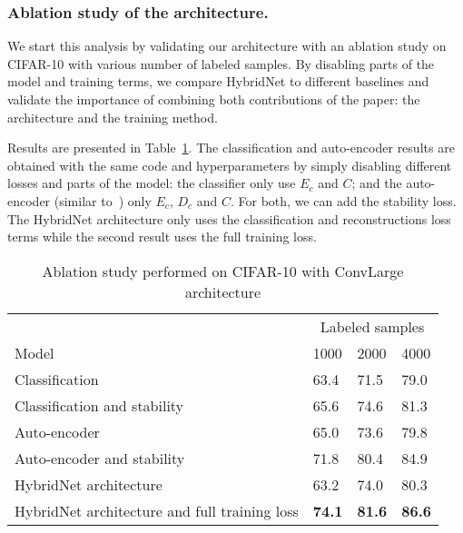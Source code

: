 \documentclass[runningheads]{llncs}
\begin{document}
\subsubsection{Ablation study of the architecture.}

We start this analysis by validating our architecture with an ablation study on CIFAR-10 with various number of labeled samples. By disabling parts of the model and training terms, we compare HybridNet to different baselines and validate the importance of combining both contributions of the paper: the architecture and the training method.

Results are presented in Table~\ref{table:ablation}. The classification and auto-encoder results are obtained with the same code and hyperparameters by simply disabling different losses and parts of the model: the classifier only use $E_c$ and $C$; and the auto-encoder (similar to~\cite{Zhao2016a}) only $E_c$, $D_c$ and $C$. For both, we can add the stability loss. The HybridNet architecture only uses the classification and reconstructions loss terms while the second result uses the full training loss.


\begin{table}[tb]
  \setlength{\tabcolsep}{4pt}
  \caption{Ablation study performed on CIFAR-10 with ConvLarge architecture}
  \label{table:ablation}
  \centering
  \begin{tabular}{llll}
    \toprule
                                              & \multicolumn{3}{c}{Labeled samples}           \\ \cmidrule{2-4}
Model                                         & 1000          & 2000          & 4000          \\ \midrule
Classification                                & 63.4          & 71.5          & 79.0          \\
Classification and stability                  & 65.6          & 74.6          & 81.3          \\ \cmidrule{1-4}
Auto-encoder                                & 65.0          & 73.6          & 79.8          \\
Auto-encoder and stability                  & 71.8          & 80.4          & 84.9          \\ \cmidrule{1-4}

HybridNet architecture                        & 63.2          & 74.0          & 80.3          \\
HybridNet architecture and full training loss & \textbf{74.1} & \textbf{81.6} & \textbf{86.6} \\ \bottomrule
  \end{tabular}
\end{table}
\end{document}
